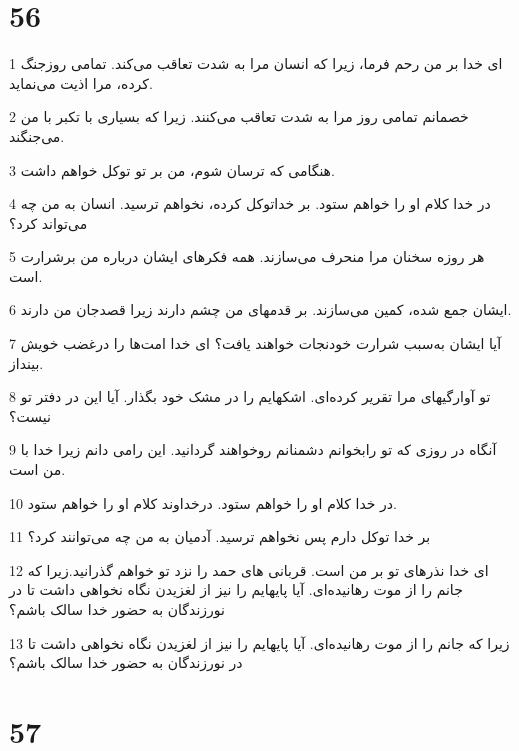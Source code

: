 \chapter{56}

\par 1 ای خدا بر من رحم فرما، زیرا که انسان مرا به شدت تعاقب می‌کند. تمامی روزجنگ کرده، مرا اذیت می‌نماید.
\par 2 خصمانم تمامی روز مرا به شدت تعاقب می‌کنند. زیرا که بسیاری با تکبر با من می‌جنگند.
\par 3 هنگامی که ترسان شوم، من بر تو توکل خواهم داشت.
\par 4 در خدا کلام او را خواهم ستود. بر خداتوکل کرده، نخواهم ترسید. انسان به من چه می‌تواند کرد؟
\par 5 هر روزه سخنان مرا منحرف می‌سازند. همه فکرهای ایشان درباره من برشرارت است.
\par 6 ایشان جمع شده، کمین می‌سازند. بر قدمهای من چشم دارند زیرا قصدجان من دارند.
\par 7 آیا ایشان به‌سبب شرارت خودنجات خواهند یافت؟ ای خدا امت‌ها را درغضب خویش بینداز.
\par 8 تو آوارگیهای مرا تقریر کرده‌ای. اشکهایم را در مشک خود بگذار. آیا این در دفتر تو نیست؟
\par 9 آنگاه در روزی که تو رابخوانم دشمنانم روخواهند گردانید. این رامی دانم زیرا خدا با من است.
\par 10 در خدا کلام او را خواهم ستود. درخداوند کلام او را خواهم ستود.
\par 11 بر خدا توکل دارم پس نخواهم ترسید. آدمیان به من چه می‌توانند کرد؟
\par 12 ‌ای خدا نذرهای تو بر من است. قربانی های حمد را نزد تو خواهم گذرانید.زیرا که جانم را از موت رهانیده‌ای. آیا پایهایم را نیز از لغزیدن نگاه نخواهی داشت تا در نورزندگان به حضور خدا سالک باشم؟
\par 13 زیرا که جانم را از موت رهانیده‌ای. آیا پایهایم را نیز از لغزیدن نگاه نخواهی داشت تا در نورزندگان به حضور خدا سالک باشم؟
 
\chapter{57}

